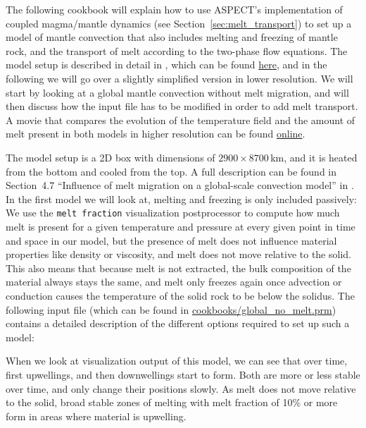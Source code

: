 \documentclass{article}
\newcommand{\aspect}{\textsc{ASPECT}}
\begin{document}
The following cookbook will explain how to use \aspect{}'s implementation of coupled magma/mantle dynamics 
(see Section~\ref{sec:melt_transport}) to set up a model of mantle convection that also includes melting 
and freezing of mantle rock, and the transport of melt according to the two-phase flow equations. 
The model setup is described in detail in \cite{dannberg_melt}, which can be found \href{https://doi.org/10.1093/gji/ggw329}{here},  
and in the following we will go over a slightly simplified version in lower resolution. 
We will start by looking at a global mantle convection without melt migration, and will 
then discuss how the input file has to be modified in order to add melt transport. A movie that compares 
the evolution of the temperature field and the amount of melt present in both models in higher resolution can be found 
\href{http://youtu.be/Kwyp4Jvx6MU}{online}. 

The model setup is a 2D box with dimensions of $2900 \times 8700$\,km, and it is heated from the bottom and 
cooled from the top. A full description can be found in Section~4.7 ``Influence of melt migration on a global-scale 
convection model'' in \cite{dannberg_melt}.
In the first model we will look at, melting and freezing is only included passively: We use the \texttt{melt fraction} visualization postprocessor to compute how much melt is present for a given temperature and pressure at every given point in time and space in our model, but the presence of melt does not influence material properties like density or viscosity, and melt does not move relative to the solid. This also means that because melt is not extracted, the bulk composition of the material always stays the same, and melt only freezes again once advection or conduction causes the temperature of the solid rock to be below the solidus. 
The following input file (which can be found in \url{cookbooks/global_no_melt.prm}) contains a detailed description of the 
different options required to set up such a model:



When we look at visualization output of this model, we can see that over time, first upwellings, and then downwellings start to form. Both are more or less stable over time, and only change their positions slowly. As melt does not move relative to the solid, broad stable zones of melting with melt fraction of 10\% or more form in areas where material is upwelling. 
\end{document}
